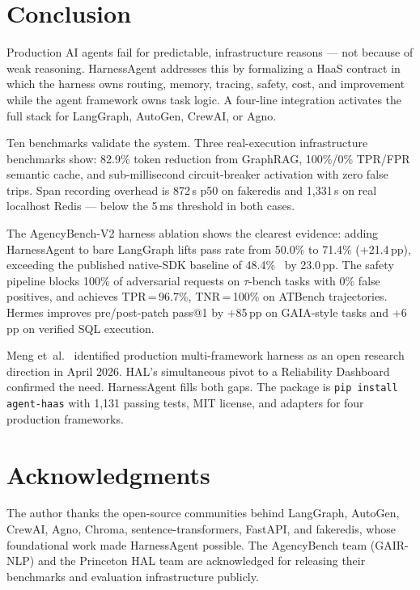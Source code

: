 \documentclass[conference]{IEEEtran}
\begin{document}
\section{Conclusion}
\label{sec:conclusion}

Production AI agents fail for predictable, infrastructure reasons —
not because of weak reasoning. HarnessAgent addresses this by
formalizing a HaaS contract in which the harness owns routing, memory,
tracing, safety, cost, and improvement while the agent framework owns
task logic. A four-line integration activates the full stack for
LangGraph, AutoGen, CrewAI, or Agno.

Ten benchmarks validate the system. Three real-execution infrastructure
benchmarks show: 82.9\% token reduction from GraphRAG, 100\%/0\%
TPR/FPR semantic cache, and sub-millisecond circuit-breaker activation
with zero false trips. Span recording overhead is 872\,\textmu{}s p50
on fakeredis and 1,331\,\textmu{}s on real localhost Redis — below the
5\,ms threshold in both cases.

The AgencyBench-V2 harness ablation shows the clearest evidence: adding
HarnessAgent to bare LangGraph lifts pass rate from 50.0\% to 71.4\%
(+21.4\,pp), exceeding the published native-SDK baseline of
48.4\%~\cite{agencybench2026} by 23.0\,pp. The safety pipeline blocks
100\% of adversarial requests on $\tau$-bench tasks with 0\% false
positives, and achieves TPR\,=\,96.7\%, TNR\,=\,100\% on ATBench
trajectories. Hermes improves pre/post-patch pass@1 by +85\,pp on
GAIA-style tasks and +6\,pp on verified SQL execution.

Meng et~al.~\cite{meng2026survey} identified production multi-framework
harness as an open research direction in April 2026. HAL's simultaneous
pivot to a Reliability Dashboard~\cite{hal2025} confirmed the need.
HarnessAgent fills both gaps. The package is \texttt{pip install
agent-haas} with 1,131 passing tests, MIT license, and adapters for
four production frameworks.

\section*{Acknowledgments}

The author thanks the open-source communities behind LangGraph, AutoGen,
CrewAI, Agno, Chroma, sentence-transformers, FastAPI, and fakeredis,
whose foundational work made HarnessAgent possible. The AgencyBench team
(GAIR-NLP) and the Princeton HAL team are acknowledged for releasing
their benchmarks and evaluation infrastructure publicly.
\end{document}
